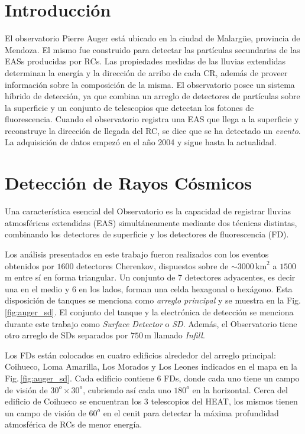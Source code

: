 

\section{Introducción}

{El observatorio Pierre Auger está ubicado en la ciudad de Malargüe, provincia de Mendoza. El mismo fue construido para detectar las partículas secundarias de las EASs producidas por RCs.  Las propiedades medidas de las lluvias extendidas determinan la energía y la dirección de arribo de cada CR, además de proveer información sobre  la composición de la  misma. El observatorio posee un sistema híbrido de detección, ya que combina un arreglo de detectores de partículas sobre la superficie y un conjunto de telescopios que detectan los fotones de fluorescencia. Cuando el observatorio  registra una EAS que llega a la superficie y reconstruye la dirección de llegada del RC, se dice que se ha detectado un \textit{evento}. La adquisición de datos empezó en el año 2004 y sigue hasta la actualidad.}


\section{Detección de Rayos Cósmicos}
Una característica esencial del Observatorio es la capacidad de registrar lluvias atmosféricas extendidas (EAS) simultáneamente mediante dos técnicas distintas, combinando los detectores de superficie y los detectores de fluorescencia (FD). 


Los análisis presentados en este trabajo fueron realizados con los eventos obtenidos por $ 1600$ detectores Cherenkov, dispuestos sobre de $\sim 3000\,\text{km}^2$ a $1500\,$m entre sí en forma triangular. Un conjunto de 7 detectores adyacentes, es decir una en el medio y 6 en los lados, forman una celda hexagonal o hexágono. Esta disposición de tanques se menciona como \textit{arreglo principal} y se muestra en la Fig.\,\ref{fig:auger_sd}. El conjunto del tanque y la electrónica de detección  se menciona durante este trabajo como \textit{Surface Detector} o \textit{SD}. Además, el Observatorio tiene otro arreglo de SDs separados por $750\,$m llamado \emph{Infill}.

Los FDs están colocados en cuatro edificios alrededor del arreglo principal: Coihueco, Loma Amarilla, Los Morados y Los Leones indicados en el mapa en la Fig.\,\ref{fig:auger_sd}. Cada edificio contiene 6 FDs, donde cada uno tiene un campo de visión de $30^o\times30^o$, cubriendo así cada uno $180^o$ en la horizontal. Cerca del edificio de Coihueco se encuentran los 3 telescopios del HEAT, los mismos tienen un campo de visión de $60^o$ en el cenit para detectar la máxima profundidad atmosférica de RCs de menor energía.

